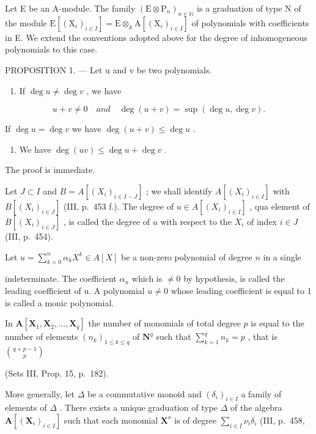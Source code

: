 Let E be an A-module. The family \((\mathrm{E} \otimes \mathrm{P}_{n})_{n \in \mathbb{N}}\) is a graduation of type N of the module \(\mathrm{E}[(\mathrm{X}_{i})_{i \in I}] = \mathrm{E} \otimes_{\mathbb{A}} \mathrm{A}[(\mathrm{X}_{i})_{i \in I}]\) of polynomials with coefficients in E. We extend the conventions adopted above for the degree of inhomogeneous polynomials to this case.

PROPOSITION 1. --- Let u and v be two polynomials.

\begin{enumerate}
\def\labelenumi{(\roman{enumi})}
\tightlist
\item
  If \(\deg u \neq \deg v\) , we have
\end{enumerate}

\[
u + v \neq 0 \quad a n d \quad \deg (u + v) = \sup (\deg u, \deg v).
\]

If \(\deg u = \deg v\) we have \(\deg (u + v) \leqslant \deg u\) .

\begin{enumerate}
\def\labelenumi{(\roman{enumi})}
\setcounter{enumi}{1}
\tightlist
\item
  We have \(\deg(uv) \leqslant \deg u + \deg v\) .
\end{enumerate}

The proof is immediate.

Let \(J \subset I\) and \(B = A[(X_i)_{i \in I - J}]\) ; we shall identify \(A[(X_i)_{i \in I}]\) with \(B[(X_i)_{i \in J}]\) (III, p.~453 f.). The degree of \(u \in A[(X_i)_{i \in I}]\) , qua element of \(B[(X_i)_{i \in J}]\) , is called the degree of \(u\) with respect to the \(X_i\) of index \(i \in J\) (III, p.~454).

Let \(u = \sum_{k=0}^{n} \alpha_k X^k \in A[X]\) be a non-zero polynomial of degree \(n\) in a single

indeterminate. The coefficient \(\alpha_{n}\) which is \(\neq0\) by hypothesis, is called the leading coefficient of u. A polynomial \(u\neq0\) whose leading coefficient is equal to 1 is called a monic polynomial.

In \(\mathbf{A}[\mathbf{X}_1, \mathbf{X}_2, \ldots, \mathbf{X}_q]\) the number of monomials of total degree \(p\) is equal to the number of elements \((n_k)_{1 \leqslant k \leqslant q}\) of \(\mathbf{N}^q\) such that \(\sum_{k=1}^{q} n_k = p\) , that is \(\binom{q + p - 1}{p}\)

(Sets III, Prop. 15, p.~182).

More generally, let \(\Delta\) be a commutative monoid and \((\delta_i)_{i \in I}\) a family of elements of \(\Delta\) . There exists a unique graduation of type \(\Delta\) of the algebra \(\mathbf{A}[(\mathbf{X}_i)_{i \in I}]\) such that each monomial \(\mathbf{X}^\nu\) is of degree \(\sum_{i \in I} \nu_i \delta_i\) (III, p.~458,

